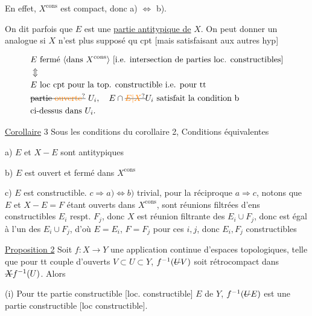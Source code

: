  En effet, $X^{\mathrm{cons}}$ est compact, donc a) $\Longleftrightarrow$ b).

On dit parfois  que  $E$ est une \uline{partie antitypique de} $X$. On peut donner un  analogue si $X$ n'est plus supposé qu cpt [mais satisfaisant aux autres hyp]

\[
\begin{aligned}
& E\ \text{fermé \inserted{dans $X^{\mathrm{cons}}$} [i.e. intersection de parties loc. constructibles]}\\
& \Updownarrow\\
& E\ \text{loc cpt pour la top. constructible i.e. pour tt}\\
& \text{\deleted{partie \unsure{ouverte}} }U_i,\quad E\cap \deleted{\unsure{E|X}}U_i\ \text{satisfait la condition b}\\
& \text{ci-dessus dans } U_i .
\end{aligned}
\]

\uline{Corollaire} 3 Sous les conditions du corollaire 2, Conditions équivalentes

a) $E$ et $X-E$ sont antitypiques

b) $E$ est  ouvert et fermé dans $X^{\mathrm{cons}}$

c) $E$ est constructible.
$c\Rightarrow a)\Longleftrightarrow b)$ trivial, pour la réciproque $a\Rightarrow c$, notons que $E$ et $X-E=F$ étant ouverts dans $X^{\mathrm{cons}}$, sont réunions   filtrées d'ens constructibles $E_i$ respt. $F_j$, donc $X$ est réunion filtrante des $E_i\cup F_j$, donc est égal à l'un des $E_i\cup F_j$, d'où $E=E_i$,  $F=F_j$ pour ces $i,j$, donc $E_i,F_j$ constructibles

\uline{Proposition 2} Soit $f:X\longrightarrow Y$ une application continue d'espaces topologiques, telle que  pour tt couple d'ouverts $V\subset U\subset Y$,   $f^{-1}(\deleted{U}V)$ soit rétrocompact dans $\deleted{X}f^{-1}(U)$. Alors


 (i) Pour tte partie constructible [loc. constructible]   $E$ de $Y$, $f^{-1}(\deleted{U}E)$ est une partie constructible [loc constructible].

